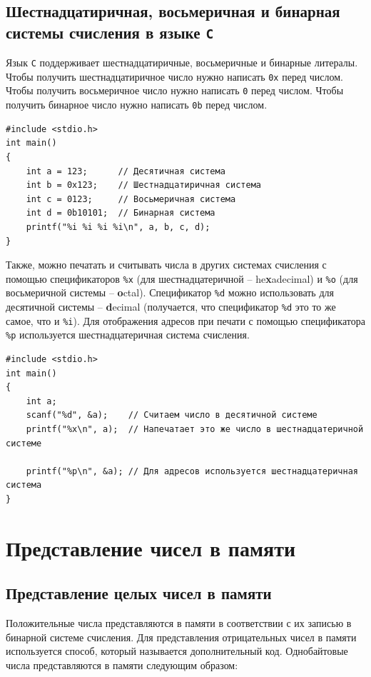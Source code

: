 \documentclass[10pt]{article}
\begin{document}
\subsection*{Шестнадцатиричная, восьмеричная и бинарная системы счисления в языке \texttt{C}}
Язык \texttt{C} поддерживает шестнадцатиричные, восьмеричные и бинарные литералы. Чтобы получить шестнадцатиричное число нужно написать \texttt{0x} перед числом. Чтобы получить восьмеричное число нужно написать \texttt{0} перед числом. Чтобы получить бинарное число нужно написать \texttt{0b} перед числом. 
\begin{lstlisting}
#include <stdio.h>
int main() 
{
    int a = 123;      // Десятичная система
    int b = 0x123;    // Шестнадцатиричная система
    int c = 0123;     // Восьмеричная система
    int d = 0b10101;  // Бинарная система
    printf("%i %i %i %i\n", a, b, c, d);
}
\end{lstlisting}
Также, можно печатать и считывать числа в других системах счисления с помощью спецификаторов \texttt{\%x} (для шестнадцатеричной -- he\textbf{x}adecimal) и \texttt{\%o} (для восьмеричной системы -- \textbf{o}ctal). Спецификатор \texttt{\%d} можно использовать для десятичной системы -- \textbf{d}ecimal (получается, что спецификатор \texttt{\%d} это то же самое, что и \texttt{\%i}). Для отображения адресов при печати с помощью спецификатора \texttt{\%p} используется шестнадцатеричная система счисления.
\begin{lstlisting}
#include <stdio.h>
int main() 
{
    int a;
    scanf("%d", &a);    // Считаем число в десятичной системе
    printf("%x\n", a);  // Напечатает это же число в шестнадцатеричной системе
    
    printf("%p\n", &a); // Для адресов используется шестнадцатеричная система
}
\end{lstlisting}


\section*{Представление чисел в памяти}

\subsection*{Представление целых чисел в памяти}
Положительные числа представляются в памяти в соответствии с их записью в бинарной системе счисления. Для представления отрицательных чисел в памяти используется способ, который называется дополнительный код. Однобайтовые числа представляются в памяти следующим образом:\\
\end{document}
